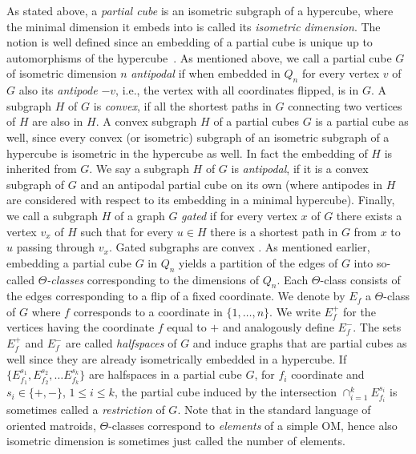 \documentclass[final,11pt]{article}
\newcommand{\comment}[1]{\textcolor{red}{#1}}
\begin{document}
As stated above, a \emph{partial cube} is an isometric subgraph of a hypercube, where the minimal dimension it embeds into is called its \emph{isometric dimension}. The notion is well defined since an embedding of a partial cube is unique up to automorphisms of the hypercube~\cite[Chapter 5]{Ovc-11}.  As mentioned above, we call a partial cube $G$ of isometric dimension $n$ \emph{antipodal} if when embedded in $Q_n$ for every vertex $v$ of $G$ also its \emph{antipode} $-v$, i.e., the vertex with all coordinates flipped, is in $G$. 
A subgraph $H$ of $G$ is \emph{convex}, if all the shortest paths in $G$ connecting two vertices of $H$ are also in $H$. A convex subgraph $H$ of a partial cubes $G$ is a partial cube as well, since every convex (or isometric) subgraph of an isometric subgraph of a hypercube is isometric in the hypercube as well. In fact the embedding of $H$ is inherited from $G$. We say a subgraph $H$ of $G$ is \emph{antipodal}, if it is a convex subgraph of $G$ and an antipodal partial cube on its own (where antipodes in $H$ are considered with respect to its embedding in a minimal hypercube). Finally, we call a subgraph $H$ of a graph $G$ \emph{gated} if for every vertex $x$ of $G$ there exists a vertex $v_x$ of $H$ such that for every $u\in H$ there is a shortest path in $G$ from $x$ to $u$ passing through $v_x$. Gated subgraphs are convex \cite[Section 12.1]{ham-11}. %
As mentioned earlier, embedding a partial cube $G$ in $Q_n$ yields a partition of the edges of $G$ into so-called \emph{$\Theta$-classes} corresponding to the dimensions of $Q_n$. Each $\Theta$-class consists of the edges corresponding to a flip of a fixed coordinate. We denote by $E_f$ a $\Theta$-class of $G$ where $f$ corresponds to a coordinate in $\{1, \ldots, n\}$. 
We write $E_f^+$ for the vertices having the coordinate $f$ equal to $+$ and analogously define $E_f^-$. The sets $E_f^+$ and $E_f^-$ are called \emph{halfspaces} of $G$ and induce graphs that are partial cubes as well since they are already isometrically embedded in a hypercube. 
If $\{E_{f_1}^{s_1}, E_{f_2}^{s_2}, \ldots E_{f_k}^{s_k}\}$ are halfspaces in a partial cube $G$, for $f_i$ coordinate and $s_i \in \{+,-\}$, $1\leq i \leq k$, the partial cube induced by the intersection $\cap_{i=1}^k E_{f_i}^{s_i}$ is sometimes called a \emph{restriction} of $G$. Note that in the standard language of oriented matroids, $\Theta$-classes correspond to \emph{elements} of a simple OM, hence also isometric dimension is sometimes just called  the number of elements. %
\end{document}

